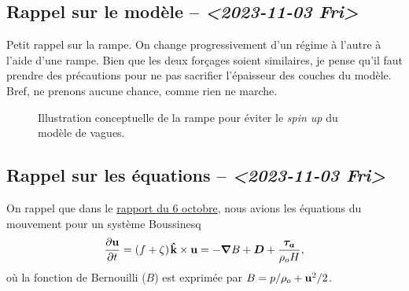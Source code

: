 \documentclass[10pt]{article}
\numberwithin{equation}{section}
\newcommand{\kvf}{\vb{\hat{k}}}
\newcommand{\uu}{\vb{u}}
\newcommand{\pt}{\hspace{1pt}} %
\begin{document}
\subsection{Rappel sur le modèle -- \textit{<2023-11-03 Fri>}}
\label{sec:orgfa00620}

Petit rappel sur la rampe.
On change progressivement d'un régime à l'autre à l'aide d'une rampe.
Bien que les deux forçages soient similaires, je pense qu'il faut prendre des précautions pour ne pas sacrifier l'épaisseur des couches du modèle.
Bref, ne prenons aucune chance, comme rien ne marche.

\begin{figure}
\begin{center}
\end{center}
\caption{\label{org74a5b10}Illustration conceptuelle de la rampe pour éviter le \emph{spin up} du modèle de vagues.}
\end{figure}

\subsection{Rappel sur les équations -- \textit{<2023-11-03 Fri>}}
\label{sec:org2433f86}

On rappel que dans le \href{rapport-2023-10-06.org}{rapport du 6 octobre}, nous avions les équations du mouvement pour un système Boussinesq
\begin{equation}
\label{eq:orgc07bc2a}
   \pdv{\uu}{t} = \qty(f+\zeta)\pt \kvf\times\uu = -\gradient{B} + \boldsymbol{D} + \frac{\boldsymbol{\tau_a}}{\rho_o H},
\end{equation}
où la fonction de Bernouilli (\(B\)) est exprimée par \(B = p/\rho_o + \uu^2/2\).\bigskip
\end{document}
